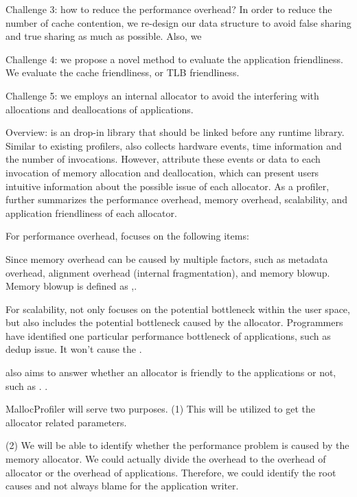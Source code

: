 Challenge 3: how to reduce the performance overhead? In order to reduce the number of cache contention, we re-design our data structure to avoid false sharing and true sharing as much as possible. Also, we 

Challenge 4: we propose a novel method to evaluate the application friendliness. We evaluate the cache friendliness, or TLB friendliness. 

Challenge 5: we employs an internal allocator to avoid the interfering with allocations and deallocations of applications.  


Overview:
\MP{} is an drop-in library that should be linked before any runtime library. Similar to existing profilers, \MP{} also collects  hardware events, time information and the number of invocations. However, \MP{} attribute these events or data to each invocation of memory allocation and deallocation, which can present users  intuitive information about the possible issue of each allocator. As a profiler, \MP{} further summarizes the performance overhead, memory overhead, scalability, and application friendliness of each allocator. 


For performance overhead, \MP{} focuses on the following items: 


Since memory overhead can be caused by multiple factors, such as metadata overhead, alignment overhead (internal fragmentation), and memory blowup. Memory blowup is defined as ,. 

For scalability, \MP{} not only focuses on the potential bottleneck within the user space, but also includes the potential bottleneck caused by the allocator. Programmers have identified one particular performance bottleneck of applications, such as dedup issue. 
It won't cause the . 

\MP{} also aims to answer whether an allocator is friendly to the applications or not, such as . . 


   


MallocProfiler will serve two purposes. 
(1) This will be utilized to get the allocator related parameters. 

(2) We will be able to identify whether the performance problem is caused by the memory allocator. We could actually divide the overhead to the overhead of allocator or the overhead of applications. 
Therefore, we could identify the root causes and not always blame for the application writer. 



 

